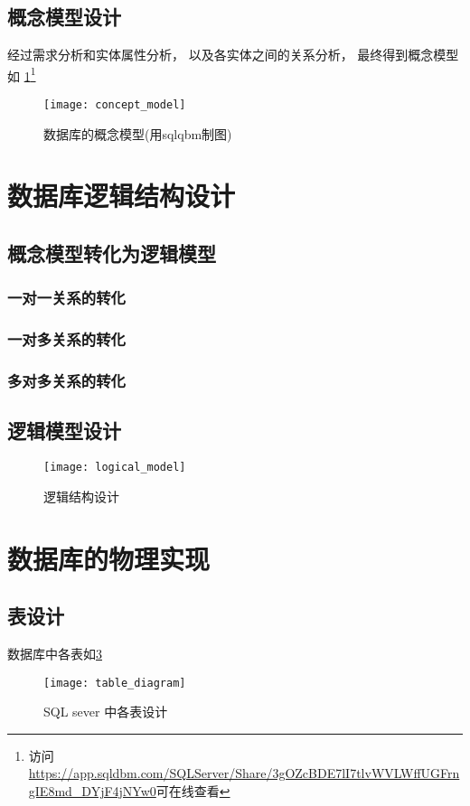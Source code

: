 \documentclass{myreport}
\begin{document}
  \subsection{概念模型设计}
    经过需求分析和实体属性分析，
    以及各实体之间的关系分析，
    最终得到概念模型如
    \cref{fig:concept_model}\footnote{访问\url{https://app.sqldbm.com/SQLServer/Share/3gOZcBDE7lI7tlvWVLWffUGFrngIE8md_DYjF4jNYw0}可在线查看}
    \begin{figure}[H]
      \centering
      \texttt{[image: concept\_model]}
      \caption{数据库的概念模型(用sqlqbm制图)}
      \label{fig:concept_model}
    \end{figure}


\section{数据库逻辑结构设计}
  \subsection{概念模型转化为逻辑模型}
    \subsubsection{一对一关系的转化}

    \subsubsection{一对多关系的转化}

    \subsubsection{多对多关系的转化}

  \subsection{逻辑模型设计}
    \begin{figure}[H]
      \centering
      \texttt{[image: logical\_model]}
      \caption{逻辑结构设计}
      \label{fig:logical_model}
    \end{figure}


\section{数据库的物理实现}
  \subsection{表设计}
    数据库中各表如\cref{fig:table_diagram}
    \begin{figure}[H]
      \centering
      \texttt{[image: table\_diagram]}
      \caption{SQL sever 中各表设计}
      \label{fig:table_diagram}
    \end{figure}
\end{document}
